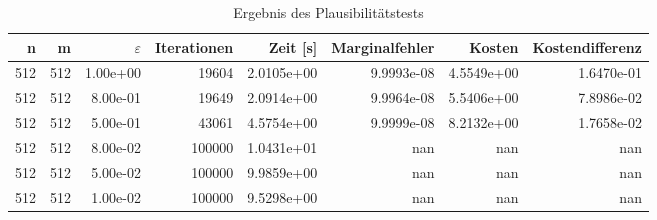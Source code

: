 \begin{table}[htbp]
\caption{Ergebnis des Plausibilitätstests}
\label{tab:Plausibilitaetstest512ZufaelligesProblem}
\small
\centering
{}
\begin{tabular}{rrrrrrrr}
\toprule
n & m & $\varepsilon$ & Iterationen & Zeit [s] & Marginalfehler & Kosten & Kostendifferenz \\
\midrule
512 & 512 & 1.00e+00 & 19604 & 2.0105e+00 & 9.9993e-08 & 4.5549e+00 & 1.6470e-01 \\
512 & 512 & 8.00e-01 & 19649 & 2.0914e+00 & 9.9964e-08 & 5.5406e+00 & 7.8986e-02 \\
512 & 512 & 5.00e-01 & 43061 & 4.5754e+00 & 9.9999e-08 & 8.2132e+00 & 1.7658e-02 \\
512 & 512 & 8.00e-02 & 100000 & 1.0431e+01 & nan & nan & nan \\
512 & 512 & 5.00e-02 & 100000 & 9.9859e+00 & nan & nan & nan \\
512 & 512 & 1.00e-02 & 100000 & 9.5298e+00 & nan & nan & nan \\
\bottomrule
\end{tabular}
\end{table}
